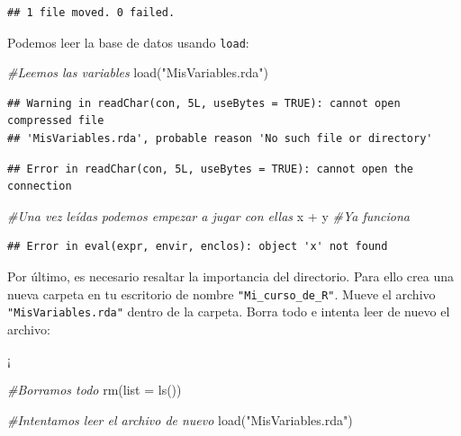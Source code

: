 \documentclass[]{tufte-book}
\newenvironment{Shaded}{}{}
\newcommand{\AttributeTok}[1]{\textcolor[rgb]{0.49,0.56,0.16}{#1}}
\newcommand{\CommentTok}[1]{\textcolor[rgb]{0.38,0.63,0.69}{\textit{#1}}}
\newcommand{\FunctionTok}[1]{\textcolor[rgb]{0.02,0.16,0.49}{#1}}
\newcommand{\NormalTok}[1]{#1}
\newcommand{\SpecialCharTok}[1]{\textcolor[rgb]{0.25,0.44,0.63}{#1}}
\newcommand{\StringTok}[1]{\textcolor[rgb]{0.25,0.44,0.63}{#1}}
\begin{document}
\begin{verbatim}
## 1 file moved. 0 failed.
\end{verbatim}

Podemos leer la base de datos usando \texttt{load}:

\begin{Shaded}
\begin{Highlighting}[]
\CommentTok{\#Leemos las variables}
\FunctionTok{load}\NormalTok{(}\StringTok{"MisVariables.rda"}\NormalTok{)}
\end{Highlighting}
\end{Shaded}

\begin{verbatim}
## Warning in readChar(con, 5L, useBytes = TRUE): cannot open compressed file
## 'MisVariables.rda', probable reason 'No such file or directory'
\end{verbatim}

\begin{verbatim}
## Error in readChar(con, 5L, useBytes = TRUE): cannot open the connection
\end{verbatim}

\begin{Shaded}
\begin{Highlighting}[]
\CommentTok{\#Una vez leídas podemos empezar a jugar con ellas}
\NormalTok{x }\SpecialCharTok{+}\NormalTok{ y }\CommentTok{\#Ya funciona}
\end{Highlighting}
\end{Shaded}

\begin{verbatim}
## Error in eval(expr, envir, enclos): object 'x' not found
\end{verbatim}

Por último, es necesario resaltar la importancia del directorio. Para
ello crea una nueva carpeta en tu escritorio de nombre
\texttt{"Mi\_curso\_de\_R"}. Mueve el archivo
\texttt{"MisVariables.rda"} dentro de la carpeta. Borra todo e intenta
leer de nuevo el archivo:

¡

\begin{Shaded}
\begin{Highlighting}[]
\CommentTok{\#Borramos todo}
\FunctionTok{rm}\NormalTok{(}\AttributeTok{list =} \FunctionTok{ls}\NormalTok{())}

\CommentTok{\#Intentamos leer el archivo de nuevo}
\FunctionTok{load}\NormalTok{(}\StringTok{"MisVariables.rda"}\NormalTok{)}
\end{Highlighting}
\end{Shaded}
\end{document}
